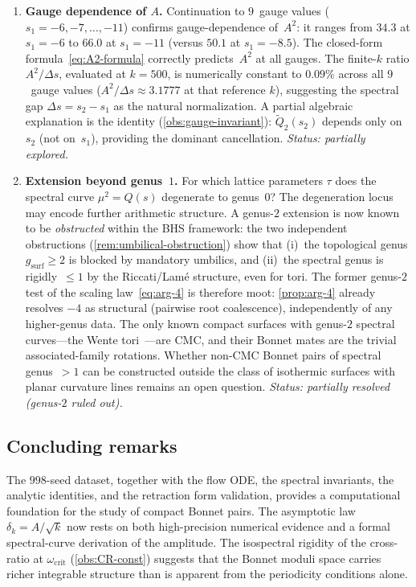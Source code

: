 \documentclass[11pt,a4paper]{article}
\theoremstyle{plain}
\theoremstyle{definition}
\theoremstyle{remark}
\begin{document}
\begin{enumerate}[label=\textbf{OP\arabic*.},nosep]
\item \textbf{Gauge dependence of $A$.}
  Continuation to $9$~gauge values ($s_1 = -6, -7, \ldots, -11$) confirms
  gauge-dependence of~$A^2$: it ranges from $34.3$ at $s_1 = -6$ to
  $66.0$ at $s_1 = -11$ (versus $50.1$ at $s_1 = -8.5$).
  The closed-form formula~\eqref{eq:A2-formula}
  correctly predicts~$A^2$ at all gauges.
  The finite-$k$ ratio $A^2/\Delta s$, evaluated at $k=500$, is numerically
  constant to $0.09\%$ across all $9$~gauge values
  ($A^2/\Delta s \approx 3.1777$ at that reference $k$),
  suggesting the spectral gap $\Delta s = s_2 - s_1$ as the
  natural normalization.  A partial algebraic explanation is
  the identity (\cref{obs:gauge-invariant}): $\tilde Q_2(s_2)$ depends
  only on~$s_2$ (not on~$s_1$), providing the dominant cancellation.
  \emph{Status: partially explored.}

\item \textbf{Extension beyond genus~$1$.}
  For which lattice parameters $\tau$ does the spectral curve
  $\mu^2 = Q(s)$ degenerate to genus~$0$?  The degeneration locus
  may encode further arithmetic structure.
  A genus-$2$ extension is now known to be \emph{obstructed}
  within the BHS framework:
  the two independent obstructions
  (\cref{rem:umbilical-obstruction}) show that
  (i)~the topological genus $g_{\mathrm{surf}} \geq 2$ is
  blocked by mandatory umbilics, and
  (ii)~the spectral genus is rigidly~$\leq 1$
  by the Riccati/Lam\'e structure, even for tori.
  The former genus-$2$ test of the scaling
  law~\eqref{eq:arg-4} is therefore moot:
  \cref{prop:arg-4} already resolves $-4$ as structural
  (pairwise root coalescence), independently of any
  higher-genus data.
  The only known compact surfaces with genus-$2$ spectral
  curves---the Wente tori~\cite{Wen86,Bob91}---are CMC, and
  their Bonnet mates are the trivial associated-family rotations.
  Whether non-CMC Bonnet pairs of spectral genus~$>1$ can
  be constructed outside the class of isothermic surfaces
  with planar curvature lines remains an open question.
  \emph{Status: partially resolved (genus-$2$ ruled out).}
\end{enumerate}

\subsection{Concluding remarks}
The $998$-seed dataset, together with the flow ODE, the spectral
invariants, the analytic identities, and the retraction form
validation, provides a computational foundation
for the study of compact Bonnet pairs.  The asymptotic law
$\delta_k = A/\sqrt{k}$ now rests on both high-precision numerical
evidence and a formal spectral-curve derivation of the amplitude.
The isospectral rigidity of the cross-ratio at
$\omega_{\mathrm{crit}}$ (\cref{obs:CR-const}) suggests that
the Bonnet moduli space carries richer integrable structure than
is apparent from the periodicity conditions alone.
\end{document}
